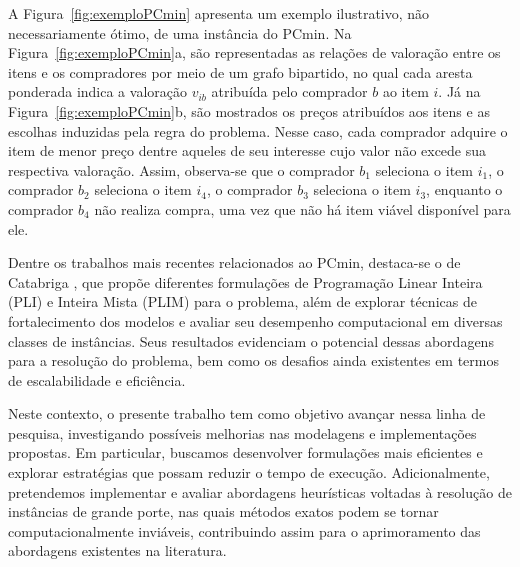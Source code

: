 A Figura~\ref{fig:exemploPCmin} apresenta um exemplo ilustrativo, não necessariamente ótimo, de uma instância do PCmin. Na Figura~\ref{fig:exemploPCmin}a, são representadas as relações de valoração entre os itens e os compradores por meio de um grafo bipartido, no qual cada aresta ponderada indica a valoração $v_{ib}$ atribuída pelo comprador $b$ ao item $i$. Já na Figura~\ref{fig:exemploPCmin}b, são mostrados os preços atribuídos aos itens e as escolhas induzidas pela regra do problema. Nesse caso, cada comprador adquire o item de menor preço dentre aqueles de seu interesse cujo valor não excede sua respectiva valoração. Assim, observa-se que o comprador $b_1$ seleciona o item $i_1$, o comprador $b_2$ seleciona o item $i_4$, o comprador $b_3$ seleciona o item $i_3$, enquanto o comprador $b_4$ não realiza compra, uma vez que não há item viável disponível para ele.


Dentre os trabalhos mais recentes relacionados ao PCmin, destaca-se o de Catabriga \cite{catabriga2025}, que propõe diferentes formulações de Programação Linear Inteira (PLI) e Inteira Mista (PLIM) para o problema, além de explorar técnicas de fortalecimento dos modelos e avaliar seu desempenho computacional em diversas classes de instâncias. Seus resultados evidenciam o potencial dessas abordagens para a resolução do problema, bem como os desafios ainda existentes em termos de escalabilidade e eficiência.

Neste contexto, o presente trabalho tem como objetivo avançar nessa linha de pesquisa, investigando possíveis melhorias nas modelagens e implementações propostas. Em particular, buscamos desenvolver formulações mais eficientes e explorar estratégias que possam reduzir o tempo de execução. Adicionalmente, pretendemos implementar e avaliar abordagens heurísticas voltadas à resolução de instâncias de grande porte, nas quais métodos exatos podem se tornar computacionalmente inviáveis, contribuindo assim para o aprimoramento das abordagens existentes na literatura.
